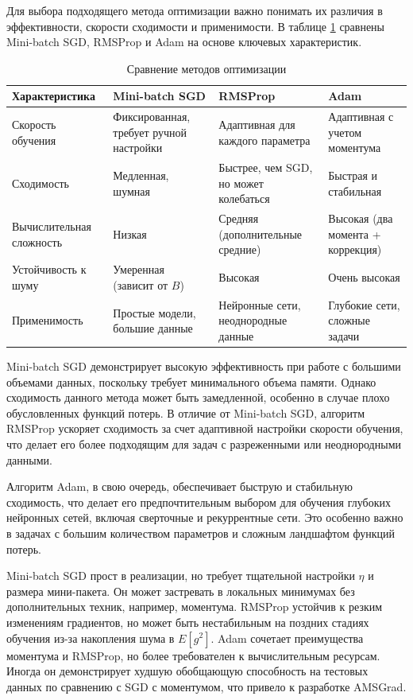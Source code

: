 \documentclass[11pt,a4paper]{article}
\begin{document}
Для выбора подходящего метода оптимизации важно понимать их различия в эффективности, скорости сходимости и применимости. В таблице \ref{table:2} сравнены Mini-batch SGD, RMSProp и Adam на основе ключевых характеристик.

\begin{table}
    \caption{Сравнение методов оптимизации}
    \setlength{\tabcolsep}{3pt}
    \label{table:2}
    \begin{tabular}{|>{\raggedright\arraybackslash}p{}|>{\raggedright\arraybackslash}p{}|>{\raggedright\arraybackslash}p{}|>{\raggedright\arraybackslash}p{}|}
    \hline
    \textbf{Характеристи\-ка} & \textbf{Mini-batch SGD} & \textbf{RMSProp} & \textbf{Adam} \\ \hline
    Скорость обучения & Фиксированная, требует ручной настройки & Адаптивная для каждого параметра & Адаптивная с учетом моментума \\ \hline
    Сходимость & Медленная, шумная & Быстрее, чем SGD, но может колебаться & Быстрая и стабильная \\ \hline
    Вычислитель\-ная сложность & Низкая & Средняя (дополнительные средние) & Высокая (два момента + коррекция) \\ \hline
    Устойчивость к шуму & Умеренная (зависит от \( B \)) & Высокая & Очень высокая \\ \hline
    Применимость & Простые модели, большие данные & Нейронные сети, неоднородные данные & Глубокие сети, сложные задачи \\ \hline
    \end{tabular}
\end{table}

Mini-batch SGD демонстрирует высокую эффективность при работе с большими объемами данных, поскольку требует минимального объема памяти. Однако сходимость данного метода может быть замедленной, особенно в случае плохо обусловленных функций потерь. В отличие от Mini-batch SGD, алгоритм RMSProp ускоряет сходимость за счет адаптивной настройки скорости обучения, что делает его более подходящим для задач с разреженными или неоднородными данными.

Алгоритм Adam, в свою очередь, обеспечивает быструю и стабильную сходимость, что делает его предпочтительным выбором для обучения глубоких нейронных сетей, включая сверточные и рекуррентные сети. Это особенно важно в задачах с большим количеством параметров и сложным ландшафтом функций потерь.

Mini-batch SGD прост в реализации, но требует тщательной настройки \( \eta \) и размера мини-пакета. Он может застревать в локальных минимумах без дополнительных техник, например, моментума. RMSProp устойчив к резким изменениям градиентов, но может быть нестабильным на поздних стадиях обучения из-за накопления шума в \( E[g^2] \). Adam сочетает преимущества моментума и RMSProp, но более требователен к вычислительным ресурсам. Иногда он демонстрирует худшую обобщающую способность на тестовых данных по сравнению с SGD с моментумом, что привело к разработке AMSGrad.
\end{document}
